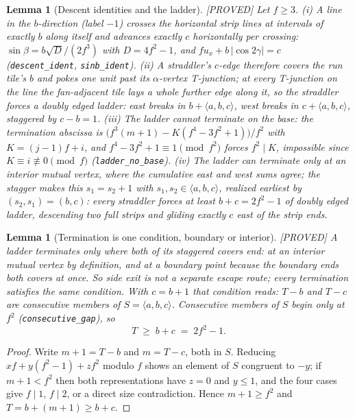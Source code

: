 \documentclass[11pt,reqno]{amsart}
\theoremstyle{plain}
\newtheorem{lemma}[theorem]{Lemma}
\theoremstyle{definition}
\newcommand{\lab}[1]{\hfill\textnormal{\footnotesize\textsc{[#1]}}}
\begin{document}
\begin{lemma}[Descent identities and the ladder]\label{lem:ladder}\lab{PROVED}
Let $f\ge3$. (i) A line in the $b$-direction (label $-1$) crosses the horizontal strip lines at
intervals of exactly $b$ along itself and advances exactly $c$ horizontally per crossing:
$\sin\beta=b\sqrt D/(2f^3)$ with $D=4f^2-1$, and $fu_x+b\,|\cos2\gamma|=c$
(\texttt{descent\_ident}, \texttt{sinb\_ident}). (ii) A straddler's $c$-edge therefore covers the
run tile's $b$ and pokes one unit past its $\alpha$-vertex T-junction; at every T-junction on the
line the fan-adjacent tile lays a whole further edge along it, so the straddler forces a doubly
edged ladder: east breaks in $b+\langle a,b,c\rangle$, west breaks in $c+\langle a,b,c\rangle$,
staggered by $c-b=1$. (iii) The ladder cannot terminate on the base: the termination abscissa is
$\bigl(f^3(m+1)-K(f^4-3f^2+1)\bigr)/f^2$ with $K=(j-1)f+i$, and $f^4-3f^2+1\equiv1 \pmod{f^2}$
forces $f^2\mid K$, impossible since $K\equiv i\not\equiv0\pmod f$
(\texttt{ladder\_no\_base}). (iv) The ladder can terminate only at an interior mutual vertex,
where the cumulative east and west sums agree; the stagger makes this $s_1=s_2+1$ with
$s_1,s_2\in\langle a,b,c\rangle$, realized earliest by $(s_2,s_1)=(b,c)$: every straddler forces
at least $b+c=2f^2-1$ of doubly edged ladder, descending two full strips and gliding exactly $c$
east of the strip ends.
\end{lemma}

\begin{lemma}[Termination is one condition, boundary or interior]\label{lem:termination}\lab{PROVED}
A ladder terminates only where \emph{both} of its staggered covers end: at an interior mutual
vertex by definition, and at a boundary point because the boundary ends both covers at once. So
side exit is not a separate escape route; every termination satisfies the same condition. With
$c=b+1$ that condition reads: $T-b$ and $T-c$ are consecutive members of
$S=\langle a,b,c\rangle$. Consecutive members of $S$ begin only at $f^2$
(\texttt{consecutive\_gap}), so
\[
  T \;\ge\; b+c \;=\; 2f^2-1 .
\]
\end{lemma}
\begin{proof}
Write $m+1=T-b$ and $m=T-c$, both in $S$. Reducing $xf+y(f^2-1)+zf^2$ modulo $f$ shows an element
of $S$ congruent to $-y$; if $m+1<f^2$ then both representations have $z=0$ and $y\le1$, and the
four cases give $f\mid1$, $f\mid2$, or a direct size contradiction. Hence $m+1\ge f^2$ and
$T=b+(m+1)\ge b+c$.
\end{proof}
\end{document}
